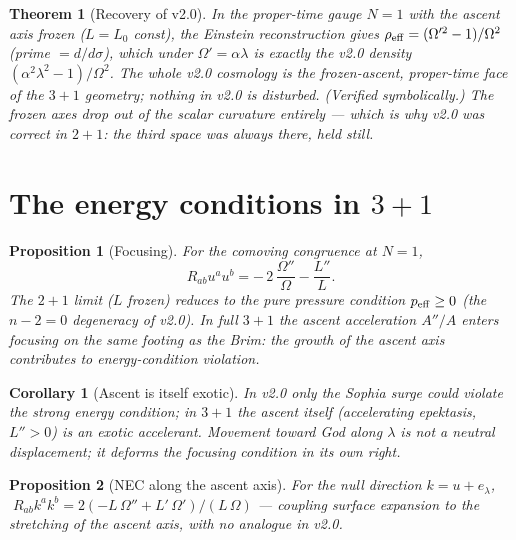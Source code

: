 \documentclass[11pt,a4paper]{article}
\theoremstyle{plain}
\newtheorem{proposition}{Proposition}
\newtheorem{corollary}{Corollary}
\newtheorem{theorem}{Theorem}
\theoremstyle{definition}
\theoremstyle{remark}
\begin{document}
\begin{theorem}[Recovery of v2.0]\label{thm:limit}
In the proper-time gauge $N=1$ with the ascent axis frozen ($L=L_0$ const), the Einstein
reconstruction gives $\rho_{\rm eff}=(\Omega'^2-1)/\Omega^2$ (prime $=d/d\sigma$), which under
$\Omega'=\alpha\lambda$ is exactly the v2.0 density $(\alpha^2\lambda^2-1)/\Omega^2$. The whole v2.0
cosmology is the frozen-ascent, proper-time face of the $3{+}1$ geometry; nothing in v2.0 is disturbed.
(Verified symbolically.) The frozen axes drop out of the scalar curvature entirely --- which is why
v2.0 was correct in $2{+}1$: the third space was always there, held still.
\end{theorem}

\section{The energy conditions in $3{+}1$}

\begin{proposition}[Focusing]\label{prop:sec}
For the comoving congruence at $N=1$,
\begin{equation}
\boxed{\;R_{ab}u^au^b=-\,2\,\frac{\Omega''}{\Omega}-\frac{L''}{L}.\;}
\end{equation}
The $2{+}1$ limit ($L$ frozen) reduces to the pure pressure condition $p_{\rm eff}\ge0$ (the $n-2=0$
degeneracy of v2.0). In full $3{+}1$ the ascent acceleration $A''/A$ enters focusing on the same
footing as the Brim: the growth of the ascent axis contributes to energy-condition violation.
\end{proposition}

\begin{corollary}[Ascent is itself exotic]
In v2.0 only the Sophia surge could violate the strong energy condition; in $3{+}1$ the ascent itself
(accelerating epektasis, $L''>0$) is an exotic accelerant. Movement toward God along $\lambda$ is not
a neutral displacement; it deforms the focusing condition in its own right.
\end{corollary}

\begin{proposition}[NEC along the ascent axis]\label{prop:nec}
For the null direction $k=u+e_\lambda$, $\;R_{ab}k^ak^b=2(-L\,\Omega''+L'\,\Omega')/(L\,\Omega)$ ---
coupling surface expansion to the stretching of the ascent axis, with no analogue in v2.0.
\end{proposition}

\end{document}
